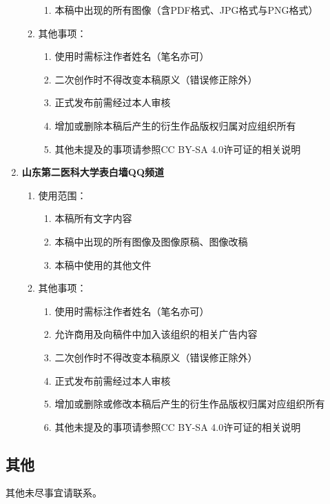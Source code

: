 \begin{enumerate}
\begin{enumerate}
\begin{enumerate}
                        \item 本稿中出现的所有图像（含PDF格式、JPG格式与PNG格式）
                    \end{enumerate}
              \item 其他事项：
                    \begin{enumerate}
                        \item 使用时需标注作者姓名（笔名亦可）
                        \item 二次创作时不得改变本稿原义（错误修正除外）
                        \item 正式发布前需经过本人审核
                        \item 增加或删除本稿后产生的衍生作品版权归属对应组织所有
                        \item 其他未提及的事项请参照CC BY-SA 4.0许可证的相关说明
                    \end{enumerate}
          \end{enumerate}
    \item \textbf{山东第二医科大学表白墙QQ频道}
          \begin{enumerate}
              \item 使用范围：
                    \begin{enumerate}
                        \item 本稿所有文字内容
                        \item 本稿中出现的所有图像及图像原稿、图像改稿
                        \item 本稿中使用的其他文件
                    \end{enumerate}
              \item 其他事项：
                    \begin{enumerate}
                        \item 使用时需标注作者姓名（笔名亦可）
                        \item 允许商用及向稿件中加入该组织的相关广告内容
                        \item 二次创作时不得改变本稿原义（错误修正除外）
                        \item 正式发布前需经过本人审核
                        \item 增加或删除或修改本稿后产生的衍生作品版权归属对应组织所有
                        \item 其他未提及的事项请参照CC BY-SA 4.0许可证的相关说明
                    \end{enumerate}
          \end{enumerate}
\end{enumerate}

\subsection[其他]{其他}
其他未尽事宜请联系。
